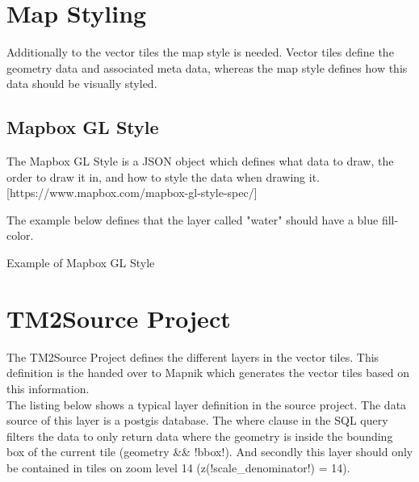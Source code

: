 \section{Map Styling}\label{part1_map_styling}

Additionally to the vector tiles the map style is needed. Vector tiles define the geometry data and associated meta data, whereas the map style defines how this data should be visually styled.

\subsection{Mapbox GL Style}

The Mapbox GL Style is a JSON object which defines what data to draw, the order to draw it in, and how to style the data when drawing it. [https://www.mapbox.com/mapbox-gl-style-spec/]

The example below defines that the layer called "water" should have a blue fill-color.

\begin{listing}[H]
\caption{Example of Mapbox GL Style}
\label{example_of_mapbox_gl_style}
\end{listing}

\section{TM2Source Project}\label{par1_tm2source_project}

The TM2Source Project defines the different layers in the vector tiles. This definition is the handed over to Mapnik which generates the vector tiles based on this information.\\
The listing below shows a typical layer definition in the source project. The data source of this layer is a postgis database. The where clause in the SQL query filters the data to only return data where the geometry is inside the bounding box of the current tile (geometry && !bbox!). And secondly this layer should only be contained in tiles on zoom level 14 (z(!scale_denominator!) = 14).

